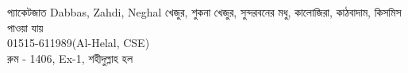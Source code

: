 \documentclass{article}
\begin{document}
\centering
{}
{{\fontsize{58}{66} \selectfont {}প্যাকেটজাত  Dabbas, Zahdi, Neghal  খেজুর, শুকনা খেজুর, সুন্দরবনের মধু, কালোজিরা, কাঠবাদাম, কিসমিস পাওয়া যায়\\}{\fontsize{50}{60}\selectfont {}01515-611989(Al-Helal, CSE)\\  রুম - 1406, Ex-1, শহীদুল্লাহ হল\\}\vspace{1.4cm}}
\end{document}
